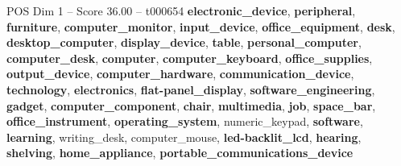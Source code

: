 \begin{textsample}{POS Dim 1 – Score 36.00 – t000654}  \label{ex:f1_pos_006}
\textbf{electronic\_device}, \textbf{peripheral}, \textbf{furniture}, \textbf{computer\_monitor}, \textbf{input\_device}, \textbf{office\_equipment}, \textbf{desk}, \textbf{desktop\_computer}, \textbf{display\_device}, \textbf{table}, \textbf{personal\_computer}, \textbf{computer\_desk}, \textbf{computer}, \textbf{computer\_keyboard}, \textbf{office\_supplies}, \textbf{output\_device}, \textbf{computer\_hardware}, \textbf{communication\_device}, \textbf{technology}, \textbf{electronics}, \textbf{flat-panel\_display}, \textbf{software\_engineering}, \textbf{gadget}, \textbf{computer\_component}, \textbf{chair}, \textbf{multimedia}, \textbf{job}, \textbf{space\_bar}, \textbf{office\_instrument}, \textbf{operating\_system}, numeric\_keypad, \textbf{software}, \textbf{learning}, writing\_desk, computer\_mouse, \textbf{led-backlit\_lcd}, \textbf{hearing}, \textbf{shelving}, \textbf{home\_appliance}, \textbf{portable\_communications\_device}

\end{textsample}
